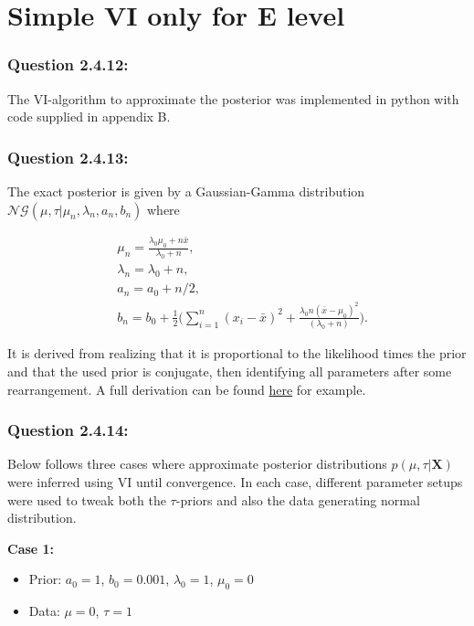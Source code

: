 \documentclass[a4paper]{article}
\begin{document}
\section{Simple VI only for E level}

\subsubsection*{Question 2.4.12:}

The VI-algorithm to approximate the posterior was implemented in python with code supplied in appendix B.

\subsubsection*{Question 2.4.13:}

The exact posterior is given by a Gaussian-Gamma distribution $\mathcal{NG}(\mu,\tau\vert \mu_n, \lambda_n, a_n, b_n)$ where

\begin{align}
&\mu_n=\frac{\lambda_0\mu_0 + n\bar{x}}{\lambda_0+n},\\
&\lambda_n = \lambda_0+n,\\
&a_n=a_0+n/2,\\
&b_n=b_0+\frac{1}{2}\bigg(\sum_{i=1}^{n}(x_i-\bar{x})^2+\frac{\lambda_0n(\bar{x}-\mu_0)^2}{(\lambda_0+n)}\bigg).
\end{align}

\noindent It is derived from realizing that it is proportional to the likelihood times the prior and that the used prior is conjugate, then identifying all parameters after some rearrangement. A full derivation can be found \href{https://www.cs.ubc.ca/~murphyk/Papers/bayesGauss.pdf}{here} for example.  

\subsubsection*{Question 2.4.14:}

Below follows three cases where approximate posterior distributions $p(\mu,\tau\vert \mathbf{X})$ were inferred using VI until convergence. In each case, different parameter setups were used to tweak both the $\tau$-priors and also the data generating normal distribution. 

\vspace{8pt}

\textbf{Case 1:} 
\begin{itemize}
	\item Prior: $a_0=1$, $b_0=0.001$, $\lambda_0=1$, $\mu_0 = 0$
	\item Data: $\mu=0$, $\tau=1$
\end{itemize}
\end{document}
